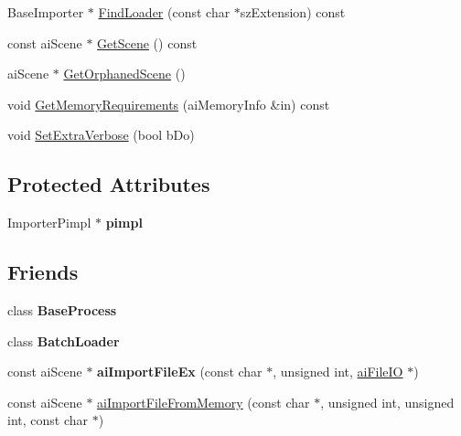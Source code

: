 \begin{DoxyCompactItemize}
Base\-Importer $\ast$ \hyperlink{class_assimp_1_1_importer_a4c1803f4397432eebad5545efdefce89}{Find\-Loader} (const char $\ast$sz\-Extension) const 
\item 
const ai\-Scene $\ast$ \hyperlink{class_assimp_1_1_importer_a26fd479a6a955969c1377fa59f92db66}{Get\-Scene} () const 
\item 
ai\-Scene $\ast$ \hyperlink{class_assimp_1_1_importer_a60eb9042fb85bfbd61a863e131a56ecd}{Get\-Orphaned\-Scene} ()
\item 
void \hyperlink{class_assimp_1_1_importer_aba2eacd0b627cb481b6d66d9ca55eac9}{Get\-Memory\-Requirements} (ai\-Memory\-Info \&in) const 
\item 
void \hyperlink{class_assimp_1_1_importer_a9bb793072c84c784279d0f6e870bb42d}{Set\-Extra\-Verbose} (bool b\-Do)
\end{DoxyCompactItemize}
\subsection*{Protected Attributes}
\begin{DoxyCompactItemize}
\item 
\hypertarget{class_assimp_1_1_importer_a3928bb8d375fd676dd5dbe33382e46ce}{Importer\-Pimpl $\ast$ {\bfseries pimpl}}\label{class_assimp_1_1_importer_a3928bb8d375fd676dd5dbe33382e46ce}

\end{DoxyCompactItemize}
\subsection*{Friends}
\begin{DoxyCompactItemize}
\item 
\hypertarget{class_assimp_1_1_importer_a7624adc48d8bacb15f1f29efa2c9c63b}{class {\bfseries Base\-Process}}\label{class_assimp_1_1_importer_a7624adc48d8bacb15f1f29efa2c9c63b}

\item 
\hypertarget{class_assimp_1_1_importer_a5fea0896b948727f91147b236db38086}{class {\bfseries Batch\-Loader}}\label{class_assimp_1_1_importer_a5fea0896b948727f91147b236db38086}

\item 
\hypertarget{class_assimp_1_1_importer_af625a61cb616962fa3ba3475843709a0}{const ai\-Scene $\ast$ {\bfseries ai\-Import\-File\-Ex} (const char $\ast$, unsigned int, \hyperlink{structai_file_i_o}{ai\-File\-I\-O} $\ast$)}\label{class_assimp_1_1_importer_af625a61cb616962fa3ba3475843709a0}

\item 
const ai\-Scene $\ast$ \hyperlink{class_assimp_1_1_importer_abeab099f57452e48c11077a2fffdc08a}{ai\-Import\-File\-From\-Memory} (const char $\ast$, unsigned int, unsigned int, const char $\ast$)
\end{DoxyCompactItemize}


